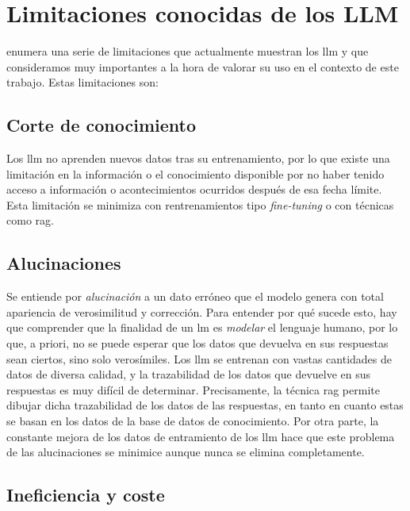 \section{Limitaciones conocidas de los LLM}
\label{sec:limitaciones_llm}

\cite{arunbijiRAGVsFinetuning} enumera una serie de limitaciones que actualmente muestran los \gls{llm} y que consideramos muy importantes a la hora de valorar su uso en el contexto de este trabajo. Estas limitaciones son:

\subsection{Corte de conocimiento}

Los \gls{llm} no aprenden nuevos datos tras su entrenamiento, por lo que existe una limitación en la información o el conocimiento disponible por no haber tenido acceso a información o acontecimientos ocurridos después de esa fecha límite. Esta limitación se minimiza con rentrenamientos tipo \emph{fine-tuning} o con técnicas como \gls{rag}.

\subsection{Alucinaciones}
\label{sec:alucinaciones}

Se entiende por \emph{alucinación} a un dato erróneo que el modelo genera con total apariencia de verosimilitud y corrección. Para entender por qué sucede esto, hay que comprender que la finalidad de un \gls{lm} es \emph{modelar} el lenguaje humano, por lo que, a priori, no se puede esperar que los datos que devuelva en sus respuestas sean ciertos, sino solo verosímiles. Los \gls{llm} se entrenan con vastas cantidades de datos de diversa calidad, y la trazabilidad de los datos que devuelve en sus respuestas es muy difícil de determinar. Precisamente, la técnica \gls{rag} permite dibujar dicha trazabilidad de los datos de las respuestas, en tanto en cuanto estas se basan en los datos de la base de datos de conocimiento. Por otra parte, la constante mejora de los datos de entramiento de los \gls{llm} \citep{gunasekarTextbooksAreAll2023} hace que este problema de las alucinaciones se minimice aunque nunca se elimina completamente.

\subsection{Ineficiencia y coste}

